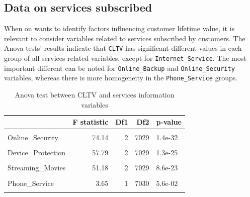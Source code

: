 \documentclass[
]{book}
\begin{document}
\hypertarget{data-on-services-subscribed-1}{%
\subsection*{Data on services subscribed}\label{data-on-services-subscribed-1}}

When on wants to identify factors influencing customer lifetime value, it is relevant to consider variables related to services subscribed by customers. The Anova tests' results indicate that \texttt{CLTV} has significant different values in each group of all services related variables, except for \texttt{Internet\_Service}. The most important different can be noted for \texttt{Online\_Backup} and \texttt{Online\_Security} variables, whereas there is more homogeneity in the \texttt{Phone\_Service} groups.

\begin{table}[H]

\caption{\label{tab:aovservices}Anova test between CLTV and services information variables}
\centering
\begin{tabular}[t]{lrrrl}
\toprule
  & F statistic & Df1 & Df2 & p-value\\
\midrule
\cellcolor{gray!6}{Online\_Backup} & \cellcolor{gray!6}{76.75} & \cellcolor{gray!6}{2} & \cellcolor{gray!6}{7029} & \cellcolor{gray!6}{1.1e-33}\\
Online\_Security & 74.14 & 2 & 7029 & 1.4e-32\\
\cellcolor{gray!6}{Multiple\_Lines} & \cellcolor{gray!6}{64.81} & \cellcolor{gray!6}{2} & \cellcolor{gray!6}{7029} & \cellcolor{gray!6}{1.3e-28}\\
Device\_Protection & 57.79 & 2 & 7029 & 1.3e-25\\
\cellcolor{gray!6}{Tech\_Support} & \cellcolor{gray!6}{54.33} & \cellcolor{gray!6}{2} & \cellcolor{gray!6}{7029} & \cellcolor{gray!6}{3.8e-24}\\
\addlinespace
Streaming\_Movies & 51.18 & 2 & 7029 & 8.6e-23\\
\cellcolor{gray!6}{Streaming\_TV} & \cellcolor{gray!6}{44.43} & \cellcolor{gray!6}{2} & \cellcolor{gray!6}{7029} & \cellcolor{gray!6}{6.7e-20}\\
Phone\_Service & 3.65 & 1 & 7030 & 5.6e-02\\
\cellcolor{gray!6}{Internet\_Service} & \cellcolor{gray!6}{0.56} & \cellcolor{gray!6}{2} & \cellcolor{gray!6}{7029} & \cellcolor{gray!6}{5.7e-01}\\
\bottomrule
\end{tabular}
\end{table}
\end{document}
